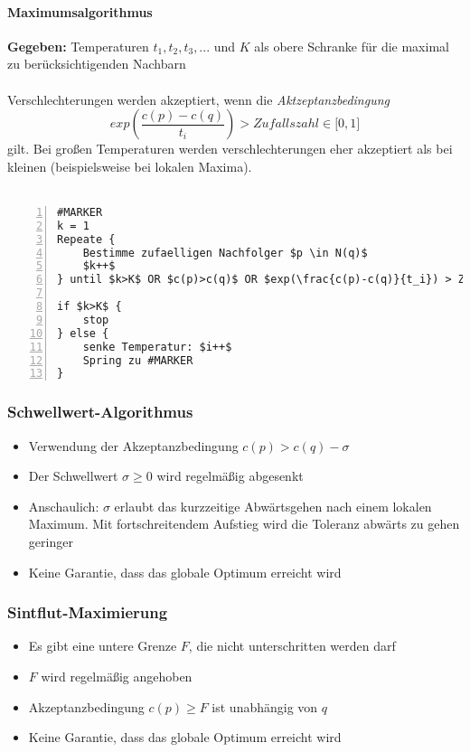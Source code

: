 \paragraph{Maximumsalgorithmus}
\textbf{Gegeben:} Temperaturen \(t_1,t_2,t_3,...\) und \(K\) als obere Schranke für die maximal zu berücksichtigenden Nachbarn
\\\\
Verschlechterungen werden akzeptiert, wenn die \textit{Aktzeptanzbedingung}
\[exp(\frac{c(p)-c(q)}{t_i}) > Zufallszahl \in \lbrack 0,1 \rbrack\]
gilt. Bei großen Temperaturen werden verschlechterungen eher akzeptiert als bei kleinen (beispielsweise bei lokalen Maxima).
\\\\
\begin{minipage}{\textwidth}
\begin{lstlisting}[frame=single,numbers=left,mathescape]
#MARKER
k = 1
Repeate {
	Bestimme zufaelligen Nachfolger $p \in N(q)$
	$k++$
} until $k>K$ OR $c(p)>c(q)$ OR $exp(\frac{c(p)-c(q)}{t_i}) > Zufallszahl \in \lbrack 0,1 \rbrack$

if $k>K$ {
	stop
} else {
	senke Temperatur: $i++$
	Spring zu #MARKER
}
\end{lstlisting}
\end{minipage}

\subsubsection{Schwellwert-Algorithmus}
\begin{itemize}
	\item Verwendung der Akzeptanzbedingung \(c(p) > c(q) - \sigma\)
	\item Der Schwellwert \(\sigma \geq 0\) wird regelmäßig abgesenkt
	\item Anschaulich: \(\sigma\) erlaubt das kurzzeitige Abwärtsgehen nach einem lokalen Maximum. Mit fortschreitendem Aufstieg wird die Toleranz abwärts zu gehen geringer
	\item Keine Garantie, dass das globale Optimum erreicht wird
\end{itemize}

\subsubsection{Sintflut-Maximierung}
\begin{itemize}
	\item Es gibt eine untere Grenze \(F\), die nicht unterschritten werden darf
	\item \(F\) wird regelmäßig angehoben
	\item Akzeptanzbedingung \(c(p) \geq F\) ist unabhängig von \(q\)
	\item Keine Garantie, dass das globale Optimum erreicht wird
\end{itemize}

